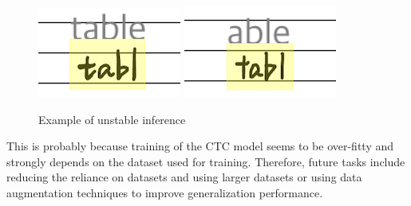 \begin{figure}
    \centering
    \includegraphics{images/table.png}
    \includegraphics{images/able.png}
    \caption{Example of unstable inference}
    \label{fig:unstable}
\end{figure}

This is probably because training of the CTC model seems to be over-fitty
and strongly depends on the dataset used for training.
Therefore, future tasks include reducing the reliance on datasets and
using larger datasets or using data augmentation techniques to improve generalization performance.
